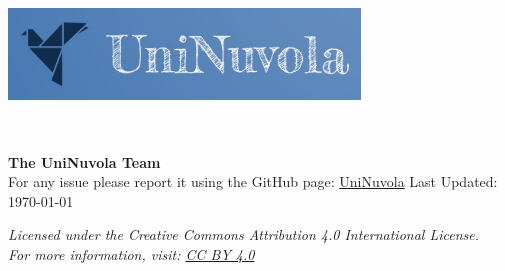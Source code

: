 \begin{titlepage}
    \thispagestyle{empty}
    \begin{center}
        \vspace*{1.5cm}
        \includegraphics[width=0.7\textwidth]{img/uninuvola_logo.jpeg} %


        \vspace{2.5cm}
        {\Huge \bfseries \doctitle} \\[1ex] %

        {\large \textit{\docsubtitle}} %

        \vspace{2.5cm}
        {\large \textbf{The UniNuvola Team}} \\[0.5ex] %

        \vspace{2.5cm}
        {\large For any issue please report it using the GitHub page: \href{https://github.com/UniNuvola/UniNuvola}{UniNuvola}}
        \vfill
        {\normalsize Last Updated: \today} %

        \vspace{1cm}
        {\small \textit{Licensed under the Creative Commons Attribution 4.0 International License.}} \\[1ex]
        {\small \textit{For more information, visit: \href{https://creativecommons.org/licenses/by/4.0/}{CC BY 4.0}}}
    \end{center}
\end{titlepage}